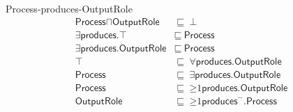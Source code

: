 \textsf{Process}-\textsf{produces}-\textsf{OutputRole}
\begin{align}
    \textsf{Process} \sqcap \textsf{OutputRole} &\sqsubseteq~\bot \\ %
    \exists\textsf{produces.$\top$} &\sqsubseteq~\textsf{Process} \\ %
    \exists\textsf{produces.OutputRole} &\sqsubseteq~\textsf{Process} \\ %
    \textsf{$\top$} &\sqsubseteq~\forall\textsf{produces.OutputRole} \\ %
    \textsf{Process} &\sqsubseteq~\exists\textsf{produces.OutputRole} \\ %
    \textsf{Process} &\sqsubseteq~\mathord{\geq}1\textsf{produces.OutputRole} \\ %
    \textsf{OutputRole} &\sqsubseteq~\mathord{\geq}1\textsf{produces}^-\textsf{.Process} %
\end{align}
